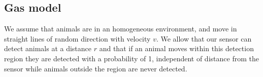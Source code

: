 \subsection{Gas model} \label{gas}

We assume that animals are in an homogeneous environment, and move in straight lines of random direction with velocity $v$. We allow that our sensor can detect animals at a distance $r$ and that if an animal moves within this detection region they are detected with a probability of 1, independent of distance from the sensor while animals outside the region are never detected.

